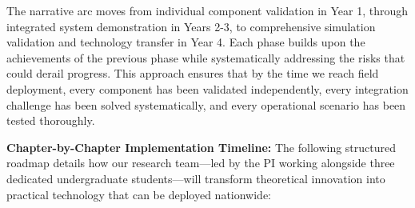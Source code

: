 \documentclass[12pt]{article}
\begin{document}
The narrative arc moves from individual component validation in Year 1, through integrated system demonstration in Years 2-3, to comprehensive simulation validation and technology transfer in Year 4. Each phase builds upon the achievements of the previous phase while systematically addressing the risks that could derail progress. This approach ensures that by the time we reach field deployment, every component has been validated independently, every integration challenge has been solved systematically, and every operational scenario has been tested thoroughly.

\textbf{Chapter-by-Chapter Implementation Timeline:} The following structured roadmap details how our research team—led by the PI working alongside three dedicated undergraduate students—will transform theoretical innovation into practical technology that can be deployed nationwide:
\end{document}
